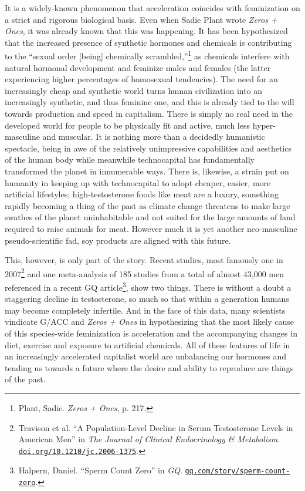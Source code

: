 \documentclass[10pt, statementpaper, twoside, openright]{memoir}
\begin{document}
It is a widely-known phenomenon that acceleration coincides with feminization on a strict and rigorous biological basis. Even when Sadie Plant wrote \textit{Zeros + Ones}, it was already known that this was happening. It has been hypothesized that the increased presence of synthetic hormones and chemicals is contributing to the ``sexual order [being] chemically scrambled,''\footnote{Plant, Sadie. \textit{Zeros + Ones}, p. 217.} as chemicals interfere with natural hormonal development and feminize males and females (the latter experiencing higher percentages of homosexual tendencies). The need for an increasingly cheap and synthetic world turns human civilization into an increasingly synthetic, and thus feminine one, and this is already tied to the will towards production and speed in capitalism. There is simply no real need in the developed world for people to be physically fit and active, much less hyper-masculine and muscular. It is nothing more than a decidedly humanistic spectacle, being in awe of the relatively unimpressive capabilities and aesthetics of the human body while meanwhile technocapital has fundamentally transformed the planet in innumerable ways. There is, likewise, a strain put on humanity in keeping up with technocapital to adopt cheaper, easier, more artificial lifestyles; high-testosterone foods like meat are a luxury, something rapidly becoming a thing of the past as climate change threatens to make large swathes of the planet uninhabitable and not suited for the large amounts of land required to raise animals for meat. However much it is yet another neo-masculine pseudo-scientific fad, soy products are aligned with this future.

This, however, is only part of the story. Recent studies, most famously one in 2007\footnote{Travison et al. ``A Population-Level Decline in Serum Testosterone Levels in American Men'' in \textit{The Journal of Clinical Endocrinology \& Metabolism}. \href{https://doi.org/10.1210/jc.2006-1375}{\nolinkurl{doi.org/10.1210/jc.2006-1375}}.} and one meta-analysis of 185 studies from a total of almost 43,000 men referenced in a recent GQ article\footnote{Halpern, Daniel. ``Sperm Count Zero'' in \textit{GQ}. \href{https://www.gq.com/story/sperm-count-zero}{\nolinkurl{gq.com/story/sperm-count-zero}}.}, show two things. There is without a doubt a staggering decline in testosterone, so much so that within a generation humans may become completely infertile. And in the face of this data, many scientists vindicate G/ACC and \textit{Zeros + Ones} in hypothesizing that the most likely cause of this species-wide feminization is acceleration and the accompanying changes in diet, exercise and exposure to artificial chemicals. All of these features of life in an increasingly accelerated capitalist world are unbalancing our hormones and tending us towards a future where the desire and ability to reproduce are things of the past.
\end{document}
